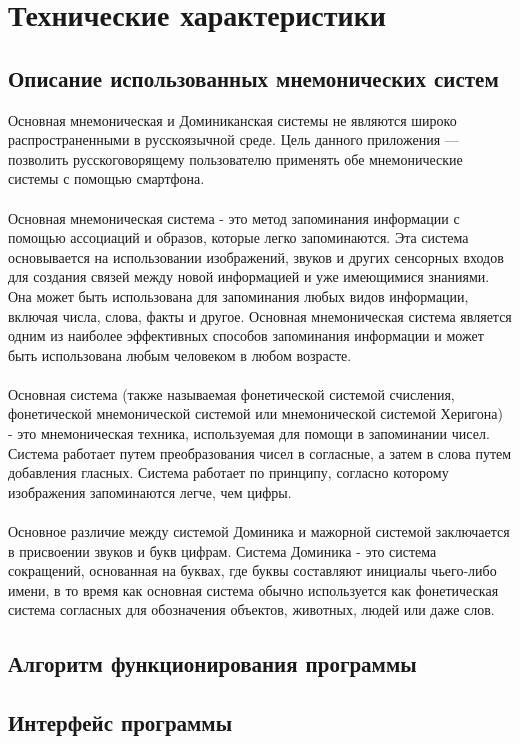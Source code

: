 \documentclass[draft]{article}
\begin{document}
\section{Технические характеристики}
\subsection{Описание использованных мнемонических систем}
Основная мнемоническая и Доминиканская системы не являются широко распространенными в русскоязычной среде. Цель данного приложения — позволить русскоговорящему пользователю применять обе мнемонические системы с помощью смартфона.\\
~\\
Основная мнемоническая система - это метод запоминания информации с помощью ассоциаций и образов, которые легко запоминаются. Эта система основывается на использовании изображений, звуков и других сенсорных входов для создания связей между новой информацией и уже имеющимися знаниями. Она может быть использована для запоминания любых видов информации, включая числа, слова, факты и другое. Основная мнемоническая система является одним из наиболее эффективных способов запоминания информации и может быть использована любым человеком в любом возрасте.\\
~\\
Основная система (также называемая фонетической системой счисления, фонетической мнемонической системой или мнемонической системой Херигона) - это мнемоническая техника, используемая для помощи в запоминании чисел. Система работает путем преобразования чисел в согласные, а затем в слова путем добавления гласных. Система работает по принципу, согласно которому изображения запоминаются легче, чем цифры.\\
~\\
Основное различие между системой Доминика и мажорной системой заключается в присвоении звуков и букв цифрам. Система Доминика - это система сокращений, основанная на буквах, где буквы составляют инициалы чьего-либо имени, в то время как основная система обычно используется как фонетическая система согласных для обозначения объектов, животных, людей или даже слов.
\subsection{Алгоритм функционирования программы}
\subsection{Интерфейс программы}
\end{document}
